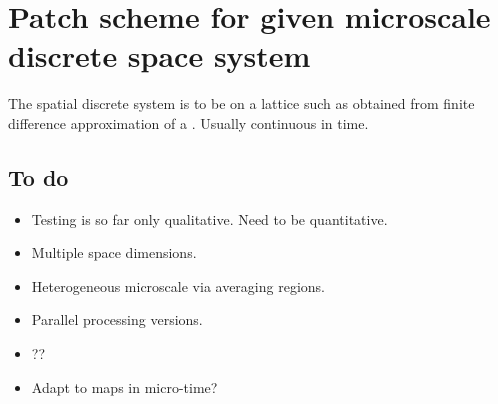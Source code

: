 \section{Patch scheme for given microscale discrete space system}
\label{sec:patch}

The spatial discrete system is to be on a lattice such as obtained from finite difference approximation of a \pde.
Usually continuous in time.






\subsection{To do}
\begin{itemize}
\item Testing is so far only qualitative.  Need to be quantitative.
\item Multiple space dimensions.
\item Heterogeneous microscale via averaging regions.
\item Parallel processing versions.
\item ??
\item Adapt to maps in micro-time?
\end{itemize}
